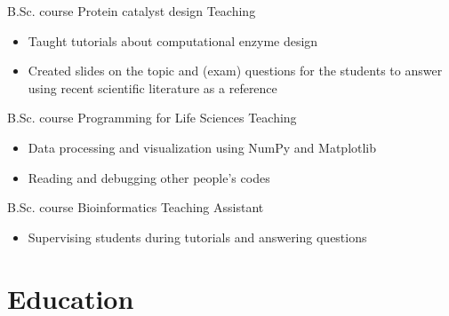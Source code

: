 \documentclass[letterpaper]{twentysecondcv} %
\begin{document}
\begin{twenty}
		{B.Sc. course Protein catalyst design}
		{Teaching}
		{\begin{itemize}
			\item Taught tutorials about computational enzyme design
			\item Created slides on the topic and (exam) questions for the students to answer using recent scientific literature as a reference
		\end{itemize}}
		{B.Sc. course Programming for Life Sciences}
		{Teaching}
		{\begin{itemize}
			\item Data processing and visualization using NumPy and Matplotlib
			\item Reading and debugging other people's codes
		\end{itemize}}
		{B.Sc. course Bioinformatics}
		{Teaching Assistant}
		{\begin{itemize}
			\item Supervising students during tutorials and answering questions
		\end{itemize}}		
\end{twenty}


\section{Education}
\end{document}
